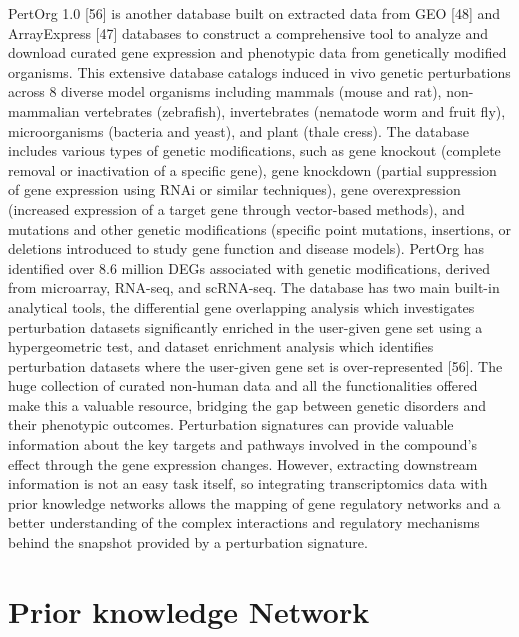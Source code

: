 PertOrg 1.0 [56] is another database built on extracted data from GEO [48] and ArrayExpress [47] databases to construct a comprehensive tool to analyze and download curated gene expression and phenotypic data from genetically modified organisms. This extensive database catalogs induced in vivo genetic perturbations across 8 diverse model organisms including mammals (mouse and rat), non-mammalian vertebrates (zebrafish), invertebrates (nematode worm and fruit fly), microorganisms (bacteria and yeast), and plant (thale cress). The database includes various types of genetic modifications, such as gene knockout (complete removal or inactivation of a specific gene), gene knockdown (partial suppression of gene expression using RNAi or similar techniques), gene overexpression (increased expression of a target gene through vector-based methods), and mutations and other genetic modifications (specific point mutations, insertions, or deletions introduced to study gene function and disease models). PertOrg has identified over 8.6 million DEGs associated with genetic modifications, derived from microarray, RNA-seq, and scRNA-seq. The database has two main built-in analytical tools, the differential gene overlapping analysis which investigates perturbation datasets significantly enriched in the user-given gene set using a hypergeometric test, and dataset enrichment analysis which identifies perturbation datasets where the user-given gene set is over-represented [56]. The huge collection of curated non-human data and all the functionalities offered make this a valuable resource, bridging the gap between genetic disorders and their phenotypic outcomes.
Perturbation signatures can provide valuable information about the key targets and pathways involved in the compound’s effect through the gene expression changes. However, extracting downstream information is not an easy task itself, so integrating transcriptomics data with prior knowledge networks allows the mapping of gene regulatory networks and a better understanding of the complex interactions and regulatory mechanisms behind the snapshot provided by a perturbation signature.


\section{Prior knowledge Network} %
\label{sec:Prior_knowledge_Network}

